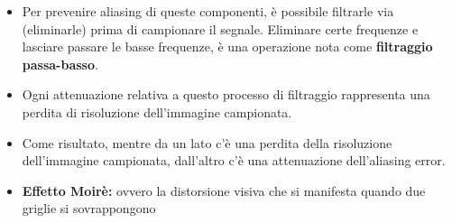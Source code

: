 
\begin{itemize}
    \item Per prevenire aliasing di queste componenti, è possibile
          filtrarle via (eliminarle) prima di campionare il segnale.
          Eliminare certe frequenze e lasciare passare le basse frequenze,
          è una operazione nota come \textbf{filtraggio passa-basso}.
    \item Ogni attenuazione relativa a questo processo di filtraggio
          rappresenta una perdita di risoluzione dell’immagine
          campionata.
    \item Come risultato, mentre da un lato c’è una perdita della
          risoluzione dell’immagine campionata, dall’altro c’è una
          attenuazione dell’aliasing error.
    \item \textbf{Effetto Moirè:} ovvero la distorsione visiva che si manifesta quando due
          griglie si sovrappongono
\end{itemize}
